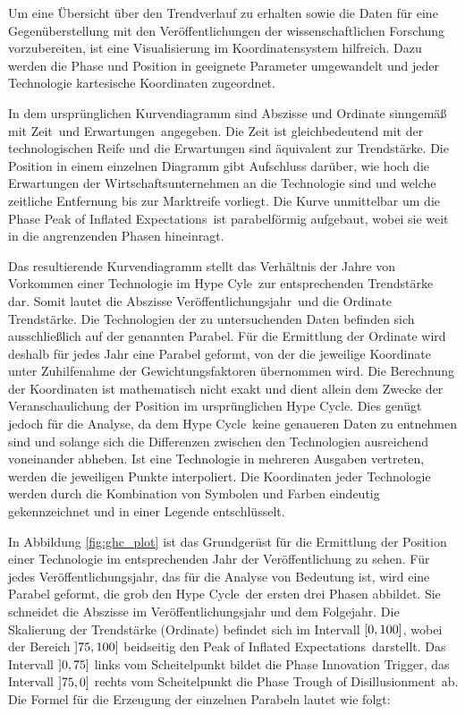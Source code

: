 Um eine Übersicht über den Trendverlauf zu erhalten sowie die Daten für eine Gegenüberstellung mit den Veröffentlichungen der wissenschaftlichen Forschung vorzubereiten, ist eine Visualisierung im Koordinatensystem hilfreich. Dazu werden die Phase und Position in geeignete Parameter umgewandelt und jeder Technologie kartesische Koordinaten zugeordnet.

In dem ursprünglichen Kurvendiagramm sind Abszisse und Ordinate sinngemäß mit \glqq Zeit\grqq~und \glqq Erwartungen\grqq~angegeben. Die Zeit ist gleichbedeutend mit der technologischen Reife und die Erwartungen sind äquivalent zur Trendstärke. Die Position in einem einzelnen Diagramm gibt Aufschluss darüber, wie hoch die Erwartungen der Wirtschaftsunternehmen an die Technologie sind und welche zeitliche Entfernung bis zur Marktreife vorliegt. Die Kurve unmittelbar um die Phase \glqq Peak of Inflated Expectations\grqq~ist parabelförmig aufgebaut, wobei sie weit in die angrenzenden Phasen hineinragt.

Das resultierende Kurvendiagramm stellt das Verhältnis der Jahre von Vorkommen einer Technologie im \glqq Hype Cyle\grqq~zur entsprechenden Trendstärke dar. Somit lautet die Abszisse \glqq Veröffentlichungsjahr\grqq~und die Ordinate \glqq Trendstärke\grqq. Die Technologien der zu untersuchenden Daten befinden sich ausschließlich auf der genannten Parabel. Für die Ermittlung der Ordinate wird deshalb für jedes Jahr eine Parabel geformt, von der die jeweilige Koordinate unter Zuhilfenahme der Gewichtungsfaktoren übernommen wird. Die Berechnung der Koordinaten ist mathematisch nicht exakt und dient allein dem Zwecke der Veranschaulichung der Position im ursprünglichen \glqq Hype Cycle\grqq. Dies genügt jedoch für die Analyse, da dem \glqq Hype Cycle\grqq~keine genaueren Daten zu entnehmen sind und solange sich die Differenzen zwischen den Technologien ausreichend voneinander abheben. Ist eine Technologie in mehreren Ausgaben vertreten, werden die jeweiligen Punkte interpoliert. Die Koordinaten jeder Technologie werden durch die Kombination von Symbolen und Farben eindeutig gekennzeichnet und in einer Legende entschlüsselt.

In Abbildung \ref{fig:ghc_plot} ist das Grundgerüst für die Ermittlung der Position einer Technologie im entsprechenden Jahr der Veröffentlichung zu sehen. Für jedes Veröffentlichungsjahr, das für die Analyse von Bedeutung ist, wird eine Parabel geformt, die grob den \glqq Hype Cycle\grqq~der ersten drei Phasen abbildet. Sie schneidet die Abszisse im Veröffentlichungsjahr und dem Folgejahr. Die Skalierung der Trendstärke (Ordinate) befindet sich im Intervall $\interval{0}{100}$, wobei der Bereich $\interval[open left]{75}{100}$ beidseitig den \glqq Peak of Inflated Expectations\grqq~darstellt. Das Intervall $\interval[open left]{0}{75}$ links vom Scheitelpunkt bildet die Phase \glqq Innovation Trigger\grqq, das Intervall $\interval[open left]{75}{0}$ rechts vom Scheitelpunkt die Phase \glqq Trough of Disillusionment\grqq~ab. Die Formel für die Erzeugung der einzelnen Parabeln lautet wie folgt:

